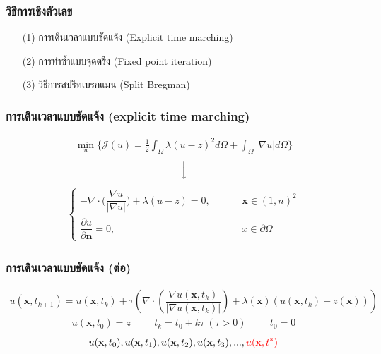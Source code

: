 \documentclass[xcolor=dvipsnames, xetex,serif]{beamer}
\numberwithin{equation}{section}
\begin{document}
    \begin{frame}
        \frametitle{วิธีการเชิงตัวเลข}
        \begin{itemize}
            \item[(1)] การเดินเวลาแบบชัดแจ้ง (Explicit time marching)
            \item[(2)] การทำซ้ำแบบจุดตรึง (Fixed point iteration)
            \item[(3)] วิธีการสปริทเบรกแมน  (Split Bregman)
        \end{itemize}
    \end{frame}
    \begin{frame}
		\frametitle{การเดินเวลาแบบชัดแจ้ง (explicit time marching)}
		\begin{align*}
		\min_{u} \{ \mathcal{J}(u) = \frac{1}{2} \int_{\Omega}\lambda (u-z)^2 d\Omega +  \int_{\Omega}  |\nabla u|  d\Omega \}
		\end{align*}
		$$ \Big \downarrow$$
		\begin{align*}
		\left \{ \begin{array}{ll}  - \nabla \cdot  \Big( \dfrac{\nabla u}{|\nabla u|} \Big) + \lambda (u-z) = 0,  & \hspace{1cm} \mathbf{x} \in (1,n)^2 \\ \dfrac{\partial u}{\partial \boldsymbol{n}} = 0, & \hspace{1cm} x \in \partial \Omega \end{array} \right .
        \end{align*}
        \let\thefootnote\relax{}						
    \end{frame} 
    \begin{frame}
        \frametitle{การเดินเวลาแบบชัดแจ้ง (ต่อ)}
        \begin{align*}
        u(\mathbf{x},t_{k+1})=u(\mathbf{x},t_{k})+\tau\left(\nabla \cdot\left(\dfrac{\nabla u (\mathbf{x},t_k)}{| \nabla u (\mathbf{x},t_k) | }\right) + \lambda(\mathbf{x})(u (\mathbf{x},t_k)-z(\mathbf{x})) \right)
        \end{align*}
        \begin{align*}
        u(\mathbf{x},t_0)=z \hspace{1cm} t_k=t_0+k\tau\ (\tau>0)  \hspace{1cm}  t_0=0
        \end{align*}
        \vspace{1cm}
        \begin{align*}
            u(\mathbf{x},t_0), u(\mathbf{x},t_1), u(\mathbf{x},t_2), u(\mathbf{x},t_3), ... ,  \textcolor{red}{u(\mathbf{x},t^{*})}
        \end{align*}
    \end{frame} 
\end{document}
